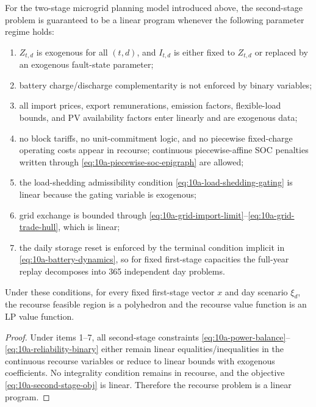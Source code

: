 \begin{proposition}
For the two-stage microgrid planning model introduced above, the second-stage problem is guaranteed to be a linear program whenever the following parameter regime holds:
\begin{enumerate}
  \item \(Z_{t,d}\) is exogenous for all \((t,d)\), and \(I_{t,d}\) is either fixed to \(Z_{t,d}\) or replaced by an exogenous fault-state parameter;
  \item battery charge/discharge complementarity is not enforced by binary variables;
  \item all import prices, export remunerations, emission factors, flexible-load bounds, and PV availability factors enter linearly and are exogenous data;
  \item no block tariffs, no unit-commitment logic, and no piecewise fixed-charge operating costs appear in recourse; continuous piecewise-affine SOC penalties written through \eqref{eq:10a-piecewise-soc-epigraph} are allowed;
  \item the load-shedding admissibility condition \eqref{eq:10a-load-shedding-gating} is linear because the gating variable is exogenous;
  \item grid exchange is bounded through \eqref{eq:10a-grid-import-limit}--\eqref{eq:10a-grid-trade-hull}, which is linear;
  \item the daily storage reset is enforced by the terminal condition implicit in \eqref{eq:10a-battery-dynamics}, so for fixed first-stage capacities the full-year replay decomposes into 365 independent day problems.
\end{enumerate}
Under these conditions, for every fixed first-stage vector \(x\) and day scenario \(\xi_d\), the recourse feasible region is a polyhedron and the recourse value function is an LP value function.
\end{proposition}

\begin{proof}
Under items 1--7, all second-stage constraints \eqref{eq:10a-power-balance}--\eqref{eq:10a-reliability-binary} either remain linear equalities/inequalities in the continuous recourse variables or reduce to linear bounds with exogenous coefficients. No integrality condition remains in recourse, and the objective \eqref{eq:10a-second-stage-obj} is linear. Therefore the recourse problem is a linear program.
\end{proof}

